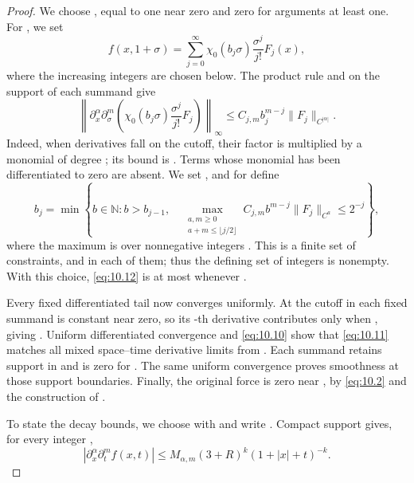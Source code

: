 \begin{proof}
We choose , equal to one near zero and zero
for arguments at least one. For , we set
\begin{equation}
f(x,1+\sigma)=\sum_{j=0}^\infty\chi_0(b_j\sigma)\frac{\sigma^j}{j!}F_j(x),
\tag{10.11}\label{eq:10.11}
\end{equation}
where the increasing integers  are chosen below. The product rule
and  on the support of each summand give
\begin{equation}
\left\|\partial_x^\alpha\partial_\sigma^m
 \left(\chi_0(b_j\sigma)\frac{\sigma^j}{j!}F_j\right)\right\|_\infty
\leq C_{j,m}b_j^{m-j}\|F_j\|_{C^{|\alpha|}}.
\tag{10.12}\label{eq:10.12}
\end{equation}
Indeed, when  derivatives fall on the cutoff, their factor
 is multiplied by a monomial of degree
; its bound is
. Terms whose monomial has been differentiated to zero are
absent. We set , and for  define
\[
b_j=\min\left\{b\in\mathbb N:b>b_{j-1},\quad
\max_{\substack{a,m\geq0\\a+m\leq\lfloor j/2\rfloor}}
C_{j,m}b^{m-j}\|F_j\|_{C^a}\leq2^{-j}\right\},
\]
where the maximum is over nonnegative integers . This is a finite set of
constraints, and  in each of them; thus the defining set of integers is
nonempty. With this choice, \eqref{eq:10.12} is at most
 whenever
.

Every fixed differentiated tail now converges uniformly. At  the
cutoff in each fixed summand is constant near zero, so its -th derivative
contributes only when , giving . Uniform
differentiated convergence and \eqref{eq:10.10} show that \eqref{eq:10.11} matches all mixed
space--time derivative limits from . Each summand retains support in
 and is zero for . The same uniform
convergence proves smoothness at those support boundaries. Finally, the original force is zero near
, by \eqref{eq:10.2} and the construction of
.

To state the decay bounds, we choose  with
 and write
. Compact support
gives, for every integer ,
\[
|\partial_x^\alpha\partial_t^mf(x,t)|
\leq M_{\alpha,m}(3+R)^k(1+|x|+t)^{-k}.
\]
\end{proof}
